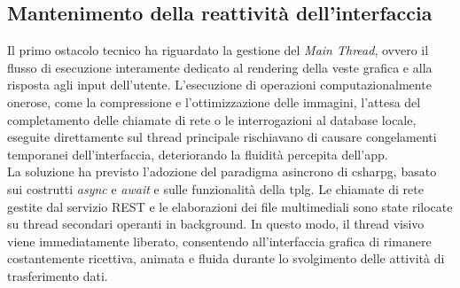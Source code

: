 \subsection*{Mantenimento della reattività dell'interfaccia}
\noindent Il primo ostacolo tecnico ha riguardato la gestione del \textit{Main Thread}, ovvero il flusso di esecuzione interamente dedicato al rendering della veste grafica e alla risposta agli input dell'utente. L'esecuzione di operazioni computazionalmente onerose, come la compressione e l'ottimizzazione delle immagini, l'attesa del completamento delle chiamate di rete o le interrogazioni al database locale, eseguite direttamente sul thread principale rischiavano di causare congelamenti temporanei dell'interfaccia, deteriorando la fluidità percepita dell'app.\\
La soluzione ha previsto l'adozione del paradigma asincrono di \gls{csharpg}, basato sui costrutti \textit{async} e \textit{await} e sulle funzionalità della \gls{tplg}. Le chiamate di rete gestite dal servizio REST e le elaborazioni dei file multimediali sono state rilocate su thread secondari operanti in background. In questo modo, il thread visivo viene immediatamente liberato, consentendo all'interfaccia grafica di rimanere costantemente ricettiva, animata e fluida durante lo svolgimento delle attività di trasferimento dati.

